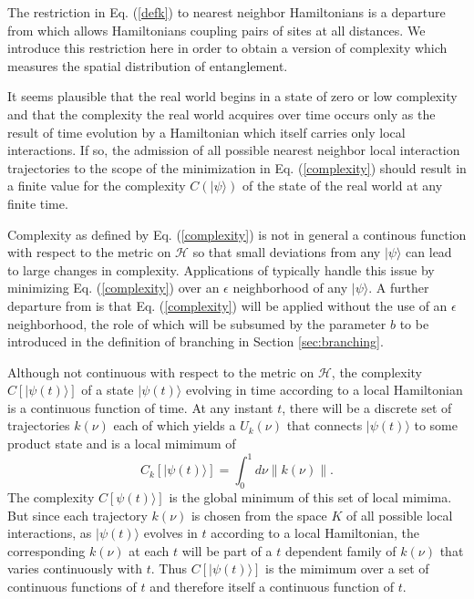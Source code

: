 \documentclass[twocolumn,amsmath,amssymb]{revtex4-1}
\begin{document}
The restriction in Eq. (\ref{defk}) to nearest neighbor Hamiltonians
is a departure from \cite{Nielsen} which allows Hamiltonians coupling
pairs of sites at all distances. 
We introduce this restriction here in order to obtain a version
of complexity which measures the spatial distribution of entanglement.

It seems plausible that the real world begins in a state of zero or low complexity
and that the complexity the real world acquires over time occurs
only as the result of time
evolution by a Hamiltonian which itself carries only  local interactions.
If so, the admission of all possible nearest neighbor local interaction trajectories
to the scope of the minimization in Eq. (\ref{complexity}) should result in a finite value for the
complexity $C( |\psi \rangle )$ of the state of the real world at any finite time.

Complexity as defined by Eq. (\ref{complexity})
is not in general a continous function with respect to the metric
on $\mathcal{H}$ so that small deviations from any $|\psi \rangle $ can lead
to large changes in complexity. Applications of \cite{Nielsen} typically
handle this issue by minimizing Eq. (\ref{complexity}) over an $\epsilon$
neighborhood of any $|\psi \rangle $.  A further departure from \cite{Nielsen}
is that Eq. (\ref{complexity}) will be applied without the
use of an $\epsilon$ neighborhood, the role of which
will be subsumed by the parameter $b$
to be introduced in the definition of branching
in Section \ref{sec:branching}.


Although not continuous with respect to the
metric on $\mathcal{H}$, the complexity $C[|\psi(t) \rangle ]$ of a state $|\psi(t) \rangle $
evolving in time according to a  local Hamiltonian
is a continuous function of time.  At any instant $t$, there will be a discrete set of trajectories
$k(\nu)$ each of  which yields a $U_k(\nu)$ that connects $|\psi(t) \rangle $ to some product state
and is a local mimimum of
\begin{equation}
  \label{integralnorm}
  C_k[ |\psi(t) \rangle ] = \int_0^1 d \nu \parallel k( \nu) \parallel.
\end{equation}
The complexity $C[ \psi(t) \rangle ]$ is the global minimum of this set of local mimima.
But since each trajectory $k(\nu)$ is chosen from the space $K$ of all possible
local interactions, as $|\psi(t) \rangle $ evolves in $t$ according to a  local Hamiltonian, the
corresponding $k(\nu)$ at each $t$ will be part of a $t$ dependent family
of $k(\nu)$ that varies continuously with $t$.
Thus $C[|\psi(t) \rangle ]$ is the mimimum over a set of continuous functions of $t$ and therefore itself
a continuous function of $t$.
\end{document}
